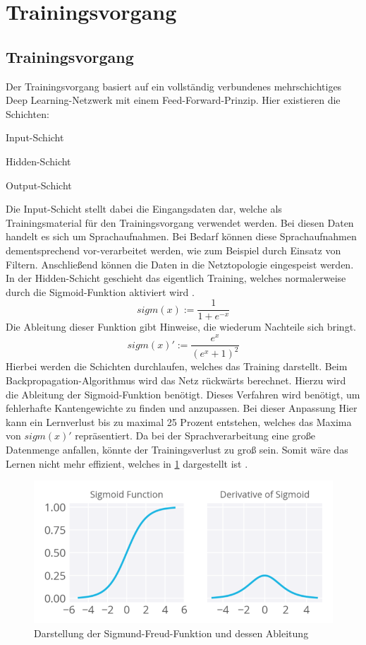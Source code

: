 \section{Trainingsvorgang}

\subsection{Trainingsvorgang}
Der Trainingsvorgang basiert auf ein vollständig verbundenes mehrschichtiges Deep Learning-Netzwerk mit einem Feed-Forward-Prinzip. Hier existieren die Schichten:
\begin{description}
	\item Input-Schicht
	\item Hidden-Schicht 
	\item Output-Schicht
\end{description}
Die Input-Schicht stellt dabei die Eingangsdaten dar, welche als Trainingsmaterial für den Trainingsvorgang verwendet werden. Bei diesen Daten handelt es sich um Sprachaufnahmen. Bei Bedarf können diese Sprachaufnahmen dementsprechend vor-verarbeitet werden, wie zum Beispiel durch Einsatz von Filtern. Anschließend können die Daten in die Netztopologie eingespeist werden. In der Hidden-Schicht geschieht das eigentlich Training, welches normalerweise durch die Sigmoid-Funktion aktiviert wird \cite{bishop.2006}.
\begin{equation*}
sigm(x) :=\frac{ 1 }{1+e^{-x}  }
\label{normal}
\end{equation*}
Die Ableitung dieser Funktion gibt Hinweise, die wiederum Nachteile sich bringt. 
\begin{equation*}
sigm(x)':= \frac{ e^{x} }{(e^{x} +1)^2  }
\label{ableitung}
\end{equation*}
Hierbei werden die Schichten durchlaufen, welches das Training darstellt. 
Beim Backpropagation-Algorithmus wird das Netz rückwärts berechnet. Hierzu wird die Ableitung der Sigmoid-Funktion benötigt. Dieses Verfahren wird benötigt, um fehlerhafte Kantengewichte zu finden und anzupassen. Bei dieser Anpassung  Hier kann ein Lernverlust bis zu maximal 25 Prozent entstehen, welches das Maxima von $sigm(x)'$ repräsentiert. Da bei der Sprachverarbeitung eine große Datenmenge anfallen, könnte der Trainingsverlust zu groß sein.  Somit wäre das Lernen nicht mehr effizient, welches in \ref{fig:features11.0} dargestellt ist \cite{Kulbear.2017}.
\begin{figure}[h!]
	\centering
	\includegraphics[width=1.0\linewidth]{images/sigmund}
	\caption{Darstellung der Sigmund-Freud-Funktion und dessen Ableitung \cite{Kulbear.2017}} %
	\label{fig:features11.0}
\end{figure}

